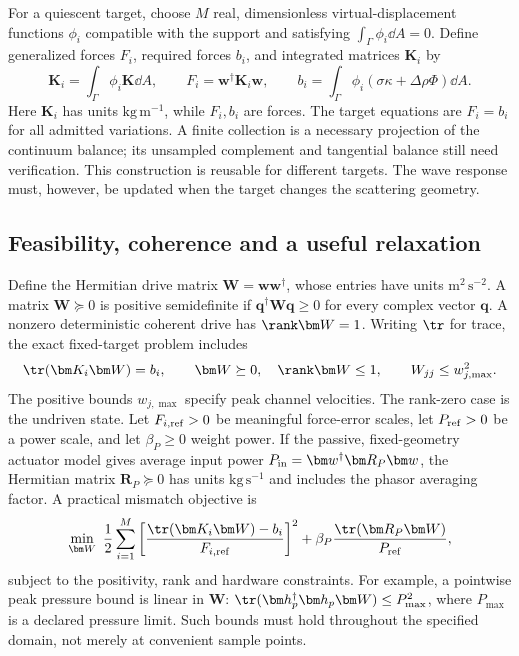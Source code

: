 For a quiescent target, choose $M$ real, dimensionless virtual-displacement
functions $\phi_i$ compatible with the support and satisfying
$\int_\Gamma\phi_i\dd A=0$. Define generalized forces $F_i$, required forces
$b_i$, and integrated matrices $\bm K_i$ by
\begin{equation}
 \bm K_i=\int_\Gamma\phi_i\bm K\dd A,\qquad
 F_i=\bm w^\dagger\bm K_i\bm w,\qquad
 b_i=\int_\Gamma\phi_i(\sigma\kappa+\Delta\rho\Phi)\dd A.
 \label{eq:modal-loads}
\end{equation}
Here $\bm K_i$ has units $\mathrm{kg\,m^{-1}}$, while $F_i,b_i$ are forces.
The target equations are $F_i=b_i$ for all admitted variations. A finite
collection is a necessary projection of the continuum balance; its unsampled
complement and tangential balance still need verification. This construction
is reusable for different targets. The wave response must, however, be updated
when the target changes the scattering geometry.

\subsection{Feasibility, coherence and a useful relaxation}
Define the Hermitian drive matrix $\bm W=\bm w\bm w^\dagger$, whose entries
have units $\mathrm{m^2\,s^{-2}}$. A matrix $\bm W\succeq0$ is positive
semidefinite if $\bm q^\dagger\bm W\bm q\geq0$ for every complex vector
$\bm q$. A nonzero deterministic coherent drive has $\rank\bm W=1$.
Writing $\tr$ for trace, the exact fixed-target problem includes
\begin{equation}
 \tr(\bm K_i\bm W)=b_i,\qquad
 \bm W\succeq0,\quad\rank\bm W\leq1,\qquad
 W_{jj}\leq w_{j,\max}^2.
 \label{eq:lifted-feasibility}
\end{equation}
The positive bounds $w_{j,\max}$ specify peak channel velocities. The rank-zero
case is the undriven state. Let $F_{i,\rm ref}>0$ be meaningful force-error
scales, let $P_{\rm ref}>0$ be a power scale, and let $\beta_P\geq0$ weight
power. If the passive, fixed-geometry actuator model gives average input power
$P_{\rm in}=\bm w^\dagger\bm R_P\bm w$, the Hermitian matrix
$\bm R_P\succeq0$ has units $\mathrm{kg\,s^{-1}}$ and includes the phasor
averaging factor. A practical mismatch objective is
\begin{equation}
 \min_{\bm W}\ \frac12\sum_{i=1}^M
  \left[\frac{\tr(\bm K_i\bm W)-b_i}{F_{i,\rm ref}}\right]^2
       +\beta_P\frac{\tr(\bm R_P\bm W)}{P_{\rm ref}},
 \label{eq:sdr-cost}
\end{equation}
subject to the positivity, rank and hardware constraints. For example, a
pointwise peak pressure bound is linear in $\bm W$:
$\tr(\bm h_p^\dagger\bm h_p\bm W)\leq P_{\max}^2$, where $P_{\max}$ is a
declared pressure limit. Such bounds must hold throughout the specified domain,
not merely at convenient sample points.


